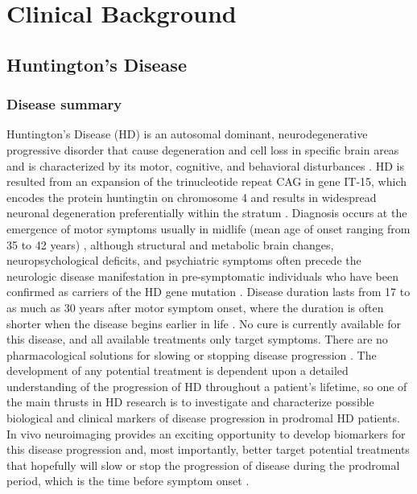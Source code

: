 \section{Clinical Background}

\subsection{Huntington's Disease}

\subsubsection{Disease summary}

\noindent Huntington's Disease (HD) is an autosomal dominant, neurodegenerative progressive disorder that cause degeneration and cell loss in specific brain areas and is characterized by its motor, cognitive, and behavioral disturbances \cite{PREDICTHD}. HD is resulted from an expansion of the trinucleotide repeat CAG in gene IT-15, which encodes the protein huntingtin on chromosome 4 \cite{Huntington1993} and results in widespread neuronal degeneration preferentially within the stratum \cite{Montoya2006}.
\newline
\newline
\noindent Diagnosis occurs at the emergence of motor symptoms usually in midlife (mean age of onset ranging from 35 to 42 years) \cite{Martin1986}, although structural and metabolic brain changes, neuropsychological deficits, and psychiatric symptoms often precede the neurologic disease manifestation in pre-symptomatic individuals who have been confirmed as carriers of the HD gene mutation \cite{Paulsen2001, Campodonico1998, Aylward2000, Harris1999}. Disease duration lasts from 17 to as much as 30 years after motor symptom onset, where the duration is often shorter when the disease begins earlier in life \cite{Martin1986, Gomez-Tortosa2001}.
\newline
\newline
\noindent No cure is currently available for this disease, and all available treatments only target symptoms. There are no pharmacological solutions for slowing or stopping disease progression \cite{Frank2010}. The development of any potential treatment is dependent upon a detailed understanding of the progression of HD throughout a patient's lifetime, so one of the main thrusts in HD research is to investigate and characterize possible biological and clinical markers of disease progression in prodromal HD patients. In vivo neuroimaging provides an exciting opportunity to develop biomarkers for this disease progression and, most importantly, better target potential treatments that hopefully will slow or stop the progression of disease during the prodromal period, which is the time before symptom onset \cite{Paulsen2008}.
\newline

